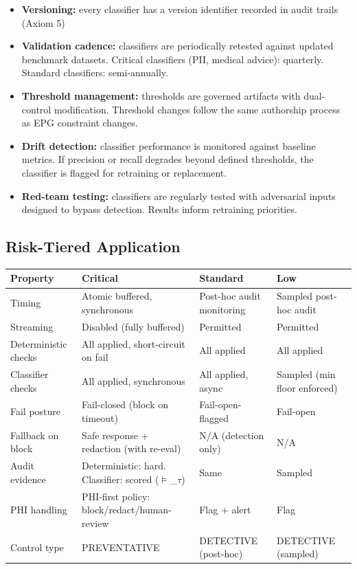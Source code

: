 \begin{itemize}
  \item \textbf{Versioning:} every classifier has a version identifier recorded in audit trails (Axiom 5)
  \item \textbf{Validation cadence:} classifiers are periodically retested against updated benchmark datasets. Critical classifiers (PII, medical advice): quarterly. Standard classifiers: semi-annually.
  \item \textbf{Threshold management:} thresholds are governed artifacts with dual-control modification. Threshold changes follow the same authorship process as EPG constraint changes.
  \item \textbf{Drift detection:} classifier performance is monitored against baseline metrics. If precision or recall degrades beyond defined thresholds, the classifier is flagged for retraining or replacement.
  \item \textbf{Red-team testing:} classifiers are regularly tested with adversarial inputs designed to bypass detection. Results inform retraining priorities.
\end{itemize}


\subsection{Risk-Tiered Application}


\begin{table}[ht]
  \centering\small
  \begin{tabular}{@{}>{\raggedright\arraybackslash}p{2.37cm}>{\raggedright\arraybackslash}p{5.34cm}>{\raggedright\arraybackslash}p{2.97cm}>{\raggedright\arraybackslash}p{3.32cm}@{}}
  \toprule
  Property & Critical & Standard & Low \\
  \midrule
  Timing & Atomic buffered, synchronous & Post-hoc audit monitoring & Sampled post-hoc audit \\
  Streaming & Disabled (fully buffered) & Permitted & Permitted \\
  Deterministic checks & All applied, short-circuit on fail & All applied & All applied \\
  Classifier checks & All applied, synchronous & All applied, async & Sampled (min floor enforced) \\
  Fail posture & Fail-closed (block on timeout) & Fail-open-flagged & Fail-open \\
  Fallback on block & Safe response + redaction (with re-eval) & N/A (detection only) & N/A \\
  Audit evidence & Deterministic: hard. Classifier: scored ($\vDash$\_\allowbreak{}$\tau$) & Same & Sampled \\
  PHI handling & PHI-first policy: block/redact/human-review & Flag + alert & Flag \\
  Control type & PREVENTATIVE & DETECTIVE (post-hoc) & DETECTIVE (sampled) \\
  \bottomrule
  \end{tabular}
\end{table}



